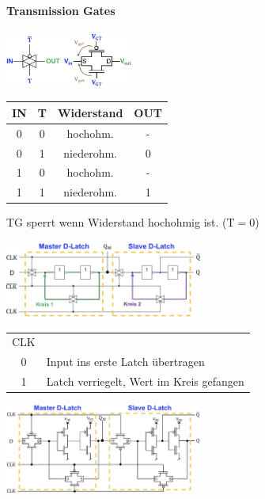 \paragraph{Transmission Gates}
\begin{center}
    \includegraphics[height = 18mm]{images/tg.jpeg}
\end{center}
\begin{center}
    \small
    \begin{tabular}{c c|c|c}
        IN & T & Widerstand & OUT\\
        \hline
        0 & 0 & hochohm. & -\\
        0 & 1 & niederohm. & 0\\
        1 & 0 & hochohm. & -\\
        1 & 1 & niederohm. & 1\\
    \end{tabular}
\end{center}
TG sperrt wenn Widerstand hochohmig ist. ($\text{T}=0$)
\begin{center}
    \includegraphics[width = 65mm]{images/d_ff_cmos.jpeg}
\end{center}
\begin{flushleft}
    \small
    \begin{tabular}{c l}
        CLK & \\
        0 & Input ins erste Latch übertragen\\
        1 & Latch verriegelt, Wert im Kreis gefangen
    \end{tabular}
\end{flushleft}
\begin{center}
    \includegraphics[width = 65mm]{images/d_ff_cmos_2.jpeg}
\end{center}
